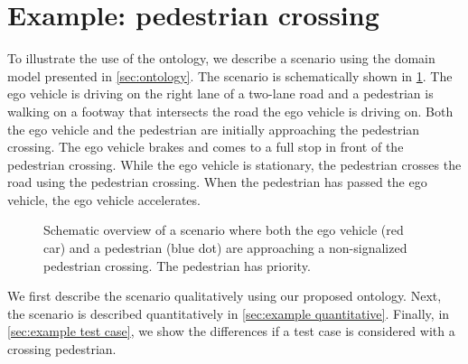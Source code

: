 \section{Example: pedestrian crossing}
\label{sec:example}

To illustrate the use of the ontology, we describe a scenario using the domain model presented in \cref{sec:ontology}. The scenario is schematically shown in \cref{fig:scenario overview}. The ego vehicle is driving on the right lane of a two-lane road and a pedestrian is walking on a footway that intersects the road the ego vehicle is driving on. Both the ego vehicle and the pedestrian are initially approaching the pedestrian crossing. The ego vehicle brakes and comes to a full stop in front of the pedestrian crossing. While the ego vehicle is stationary, the pedestrian crosses the road using the pedestrian crossing. When the pedestrian has passed the ego vehicle, the ego vehicle accelerates.

\setlength{\figurewidth}{\linewidth}
\begin{figure}
	\centering
	
	\caption{Schematic overview of a scenario where both the ego vehicle (red car) and a pedestrian (blue dot) are approaching a non-signalized pedestrian crossing. The pedestrian has priority. 
	}
	\label{fig:scenario overview}
\end{figure}

\cbstart
We first describe the scenario qualitatively using our proposed ontology. Next, the scenario is described quantitatively in \cref{sec:example quantitative}. Finally, in \cref{sec:example test case}, we show the differences if a test case is considered with a crossing pedestrian.


